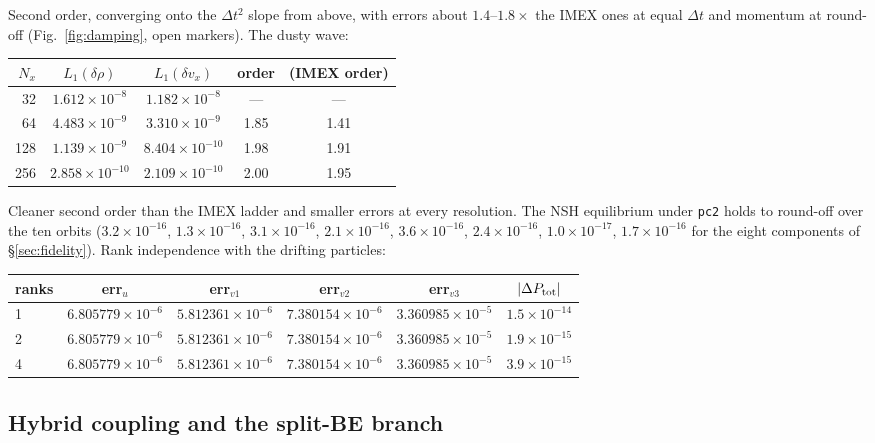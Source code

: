 \documentclass[11pt]{article}
\newcommand{\code}[1]{\texttt{#1}}
\begin{document}
Second order, converging onto the $\Delta t^2$ slope from above, with errors about
$1.4$--$1.8\times$ the IMEX ones at equal $\Delta t$ and momentum at round-off
(Fig.~\ref{fig:damping}, open markers). The dusty wave:

\begin{center}
\small
\begin{tabular}{@{}rcccc@{}}
\toprule
$N_x$ & $L_1(\delta\rho)$ & $L_1(\delta v_x)$ & order & (IMEX order) \\
\midrule
32  & $1.612\times10^{-8}$  & $1.182\times10^{-8}$  & --- & --- \\
64  & $4.483\times10^{-9}$  & $3.310\times10^{-9}$  & 1.85 & 1.41 \\
128 & $1.139\times10^{-9}$  & $8.404\times10^{-10}$ & 1.98 & 1.91 \\
256 & $2.858\times10^{-10}$ & $2.109\times10^{-10}$ & 2.00 & 1.95 \\
\bottomrule
\end{tabular}
\end{center}

Cleaner second order than the IMEX ladder and smaller errors at every resolution.
The NSH equilibrium under \code{pc2} holds to round-off over the ten orbits
($3.2\times10^{-16}$, $1.3\times10^{-16}$, $3.1\times10^{-16}$, $2.1\times10^{-16}$,
$3.6\times10^{-16}$, $2.4\times10^{-16}$, $1.0\times10^{-17}$, $1.7\times10^{-16}$ for
the eight components of \S\ref{sec:fidelity}). Rank independence with the drifting
particles:

\begin{center}
\small
\begin{tabular}{@{}lccccc@{}}
\toprule
ranks & err$_u$ & err$_{v1}$ & err$_{v2}$ & err$_{v3}$ & $|\Delta P_{\rm tot}|$ \\
\midrule
1 & $6.805779\times10^{-6}$ & $5.812361\times10^{-6}$ & $7.380154\times10^{-6}$ & $3.360985\times10^{-5}$ & $1.5\times10^{-14}$ \\
2 & $6.805779\times10^{-6}$ & $5.812361\times10^{-6}$ & $7.380154\times10^{-6}$ & $3.360985\times10^{-5}$ & $1.9\times10^{-15}$ \\
4 & $6.805779\times10^{-6}$ & $5.812361\times10^{-6}$ & $7.380154\times10^{-6}$ & $3.360985\times10^{-5}$ & $3.9\times10^{-15}$ \\
\bottomrule
\end{tabular}
\end{center}

\subsection{Hybrid coupling and the split-BE branch}
\end{document}
